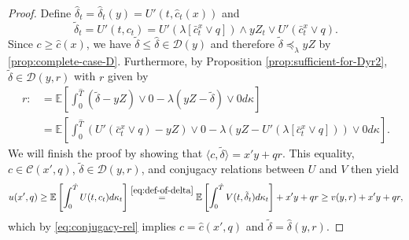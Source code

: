 \documentclass[11pt, oneside]{article}   	%
\theoremstyle{plain}
\theoremstyle{definition}
\theoremstyle{remark}
\begin{document}
\begin{proof}
Define $\hat\delta_t=\hat\delta_t(y)=U'(t,\hat{c}_t(x))$ and
\begin{equation}\label{eq:def-of-delta}
\tilde\delta_t=U'(t,c_t)=U'(\lambda [\bar{c}_t^{x}\vee q])\wedge yZ_t\vee U'(\bar{c}_t^{x}\vee q).
\end{equation}
Since $c\geq\hat{c}(x)$, we have $\tilde\delta\leq \hat{\delta}\in\mathcal{D}(y)$ and therefore $\tilde\delta\preceq_\lambda yZ$ by \eqref{prop:complete-case-D}. Furthermore, by Proposition \ref{prop:sufficient-for-Dyr2}, $\tilde\delta\in\mathcal{D}(y,r)$ with $r$ given by
\begin{equation*}
\begin{aligned}
r:&=\mathbb{E}\left[\int_0^{\hat{T}} (\tilde\delta-yZ)\vee 0-\lambda(yZ-\tilde\delta)\vee0 d\kappa\right]\\
&=\mathbb{E}\left[\int_0^{\hat{T}} (U'(\bar{c}_t^{x}\vee q)-yZ)\vee 0-\lambda(yZ-U'(\lambda [\bar{c}_t^{x}\vee q]))\vee0 d\kappa\right].
\end{aligned}
\end{equation*}
We will finish the proof by showing that $\langle c,\tilde\delta\rangle=x'y+qr$. This equality, $c\in\mathcal{C}(x',q)$, $\tilde\delta\in\mathcal{D}(y,r)$, and conjugacy relations between $U$ and $V$ then yield
$$u(x',q)\geq\mathbb{E}\left[\int_0^{\hat{T}} U(t,c_t)d\kappa_t\right]\overset{\eqref{eq:def-of-delta}}{=}\mathbb{E}\left[\int_0^{\hat{T}} V(t,\tilde\delta_t)d\kappa_t\right]+x'y+qr\geq v(y,r)+x'y+qr,$$
which by \eqref{eq:conjugacy-rel} implies $c=\hat{c}(x',q)$ and $\tilde\delta=\hat\delta(y,r)$.


\end{proof}
\end{document}
